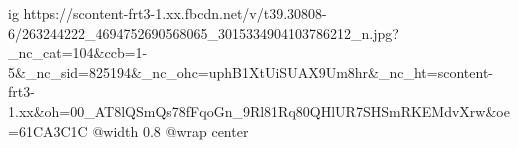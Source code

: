  
 
 
 
 

\ifcmt
  ig https://scontent-frt3-1.xx.fbcdn.net/v/t39.30808-6/263244222_4694752690568065_3015334904103786212_n.jpg?_nc_cat=104&ccb=1-5&_nc_sid=825194&_nc_ohc=uphB1XtUiSUAX9Um8hr&_nc_ht=scontent-frt3-1.xx&oh=00_AT8lQSmQs78fFqoGn_9Rl81Rq80QHlUR7SHSmRKEMdvXrw&oe=61CA3C1C
  @width 0.8
	@wrap center
\fi
